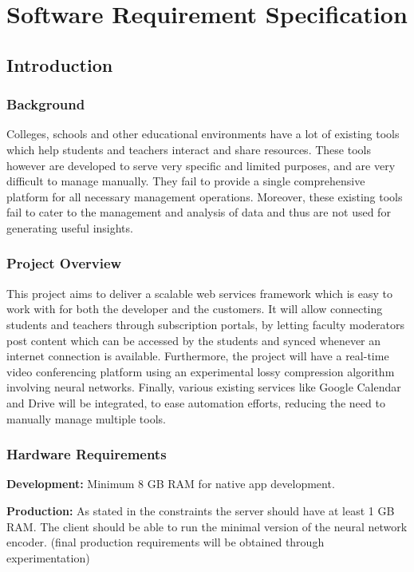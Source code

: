 \chapter{Software Requirement Specification}

\section{Introduction}

\subsection{Background}

Colleges, schools and other educational environments have a lot of existing tools 
which help students and teachers interact and share resources.
These tools however are developed to serve very specific and limited purposes, and are very difficult to 
manage manually. They fail to provide a single comprehensive platform for all 
necessary management operations. Moreover, these existing tools fail to cater to the 
management and analysis of data and thus are not used for generating useful 
insights.

\subsection{Project Overview}

This project aims to deliver a scalable web services framework which is easy to work 
with for both the developer and the customers. It will allow connecting students and 
teachers through subscription portals, by letting faculty moderators post content 
which can be accessed by the students and synced whenever an internet connection 
is available. Furthermore, the project will have a real-time video conferencing platform 
using an experimental lossy compression algorithm involving neural networks. 
Finally, various existing services like Google Calendar and Drive will be integrated, to ease 
automation efforts, reducing the need to manually manage multiple tools.

\subsection{Hardware Requirements}

\textbf{Development:} 
Minimum 8 GB RAM for native app development.

\textbf{Production:} 
As stated in the constraints the server should have at least 1 GB RAM.
The client should be able to run the minimal version of the neural network encoder.
(final production requirements will be obtained through experimentation)

